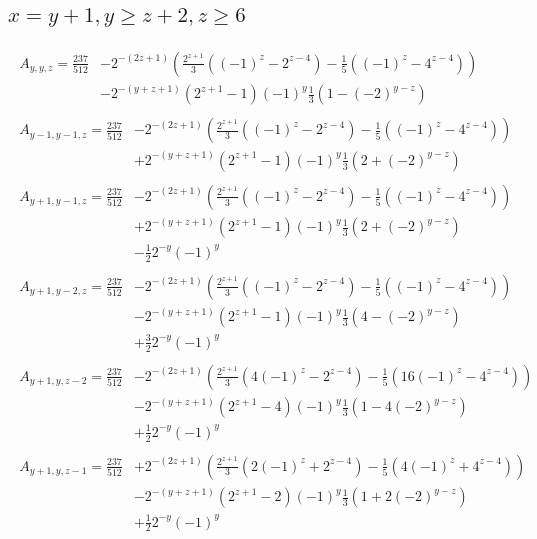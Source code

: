 \newpage
\subsection*{$x=y+1,y\ge z+2,z\ge6$}
\begin{align*}
\begin{split}
A_{y,y,z}=\frac{237}{512} &-2^{-(2z+1)}\left(\frac{2^{z+1}}{3}\left((-1)^z-2^{z-4}\right)-\frac{1}{5}\left((-1)^z-4^{z-4}\right)\right)\\
& -2^{-(y+z+1)}\left(2^{z+1}-1\right)(-1)^y\frac{1}{3}\left(1-(-2)^{y-z}\right)
\end{split}\\
\begin{split}
A_{y-1,y-1,z}=\frac{237}{512} &-2^{-(2z+1)}\left(\frac{2^{z+1}}{3}\left((-1)^z-2^{z-4}\right)-\frac{1}{5}\left((-1)^z-4^{z-4}\right)\right)\\
& +2^{-(y+z+1)}\left(2^{z+1}-1\right)(-1)^y\frac{1}{3}\left(2+(-2)^{y-z}\right)
\end{split}\\
\begin{split}
A_{y+1,y-1,z}=\frac{237}{512} &-2^{-(2z+1)}\left(\frac{2^{z+1}}{3}\left((-1)^z-2^{z-4}\right)-\frac{1}{5}\left((-1)^z-4^{z-4}\right)\right)\\
& +2^{-(y+z+1)}\left(2^{z+1}-1\right)(-1)^y\frac{1}{3}\left(2+(-2)^{y-z}\right)\\
& -\frac{1}{2}2^{-y}(-1)^y
\end{split}\\
\begin{split}
A_{y+1,y-2,z}=\frac{237}{512} &-2^{-(2z+1)}\left(\frac{2^{z+1}}{3}\left((-1)^z-2^{z-4}\right)-\frac{1}{5}\left((-1)^z-4^{z-4}\right)\right)\\
& -2^{-(y+z+1)}\left(2^{z+1}-1\right)(-1)^y\frac{1}{3}\left(4-(-2)^{y-z}\right)\\
& +\frac{3}{2}2^{-y}(-1)^y
\end{split}\\
\begin{split}
A_{y+1,y,z-2}=\frac{237}{512} &-2^{-(2z+1)}\left(\frac{2^{z+1}}{3}\left(4(-1)^z-2^{z-4}\right)-\frac{1}{5}\left(16(-1)^z-4^{z-4}\right)\right)\\
& -2^{-(y+z+1)}\left(2^{z+1}-4\right)(-1)^y\frac{1}{3}\left(1-4(-2)^{y-z}\right)\\
& +\frac{1}{2}2^{-y}(-1)^y
\end{split}\\
\begin{split}
A_{y+1,y,z-1}=\frac{237}{512} &+2^{-(2z+1)}\left(\frac{2^{z+1}}{3}\left(2(-1)^z+2^{z-4}\right)-\frac{1}{5}\left(4(-1)^z+4^{z-4}\right)\right)\\
& -2^{-(y+z+1)}\left(2^{z+1}-2\right)(-1)^y\frac{1}{3}\left(1+2(-2)^{y-z}\right)\\
& +\frac{1}{2}2^{-y}(-1)^y
\end{split}
\end{align*}

